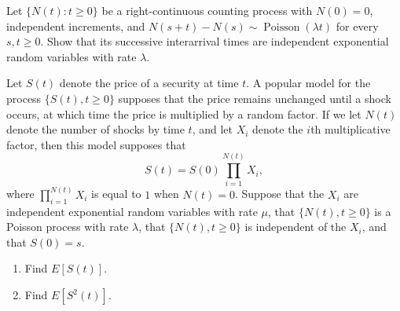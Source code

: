 \begin{exercise}
\label{ex:counting-processes-35}
Let $\{N(t):t\ge0\}$ be a right-continuous counting process with $N(0)=0$,
independent increments, and
$N(s+t)-N(s)\sim\operatorname{Poisson}(\lambda t)$ for every $s,t\ge0$.
Show that its successive interarrival times are independent exponential
random variables with rate $\lambda$.
\end{exercise}


\begin{exercise}
\label{ex:counting-processes-36}
Let $S(t)$ denote the price of a security at time $t$. A popular model for the process $\{S(t),t\ge 0\}$ supposes that the price remains unchanged until a shock occurs, at which time the price is multiplied by a random factor. If we let $N(t)$ denote the number of shocks by time $t$, and let $X_i$ denote the $i$th multiplicative factor, then this model supposes that
\[
S(t)=S(0)\prod_{i=1}^{N(t)}X_i,
\]
where $\prod_{i=1}^{N(t)}X_i$ is equal to $1$ when $N(t)=0$. Suppose that the $X_i$ are independent exponential random variables with rate $\mu$, that $\{N(t),t\ge 0\}$ is a Poisson process with rate $\lambda$, that $\{N(t),t\ge 0\}$ is independent of the $X_i$, and that $S(0)=s$.
\begin{enumerate}
\item Find $E[S(t)]$.
\item Find $E[S^2(t)]$.
\end{enumerate}
\end{exercise}

